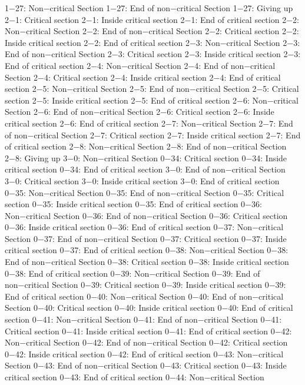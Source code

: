 1−27: Non−critical Section
1−27: End of non−critical Section
1−27: Giving up
2−1: Critical section
2−1: Inside critical section
2−1: End of critical section
2−2: Non−critical Section
2−2: End of non−critical Section
2−2: Critical section
2−2: Inside critical section
2−2: End of critical section
2−3: Non−critical Section
2−3: End of non−critical Section
2−3: Critical section
2−3: Inside critical section
2−3: End of critical section
2−4: Non−critical Section
2−4: End of non−critical Section
2−4: Critical section
2−4: Inside critical section
2−4: End of critical section
2−5: Non−critical Section
2−5: End of non−critical Section
2−5: Critical section
2−5: Inside critical section
2−5: End of critical section
2−6: Non−critical Section
2−6: End of non−critical Section
2−6: Critical section
2−6: Inside critical section
2−6: End of critical section
2−7: Non−critical Section
2−7: End of non−critical Section
2−7: Critical section
2−7: Inside critical section
2−7: End of critical section
2−8: Non−critical Section
2−8: End of non−critical Section
2−8: Giving up
3−0: Non−critical Section
0−34: Critical section
0−34: Inside critical section
0−34: End of critical section
3−0: End of non−critical Section
3−0: Critical section
3−0: Inside critical section
3−0: End of critical section
0−35: Non−critical Section
0−35: End of non−critical Section
0−35: Critical section
0−35: Inside critical section
0−35: End of critical section
0−36: Non−critical Section
0−36: End of non−critical Section
0−36: Critical section
0−36: Inside critical section
0−36: End of critical section
0−37: Non−critical Section
0−37: End of non−critical Section
0−37: Critical section
0−37: Inside critical section
0−37: End of critical section
0−38: Non−critical Section
0−38: End of non−critical Section
0−38: Critical section
0−38: Inside critical section
0−38: End of critical section
0−39: Non−critical Section
0−39: End of non−critical Section
0−39: Critical section
0−39: Inside critical section
0−39: End of critical section
0−40: Non−critical Section
0−40: End of non−critical Section
0−40: Critical section
0−40: Inside critical section
0−40: End of critical section
0−41: Non−critical Section
0−41: End of non−critical Section
0−41: Critical section
0−41: Inside critical section
0−41: End of critical section
0−42: Non−critical Section
0−42: End of non−critical Section
0−42: Critical section
0−42: Inside critical section
0−42: End of critical section
0−43: Non−critical Section
0−43: End of non−critical Section
0−43: Critical section
0−43: Inside critical section
0−43: End of critical section
0−44: Non−critical Section
